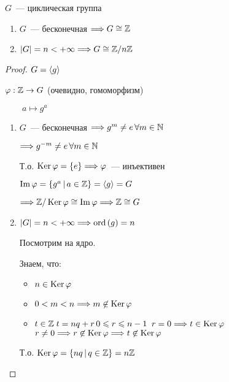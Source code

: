 \begin{theorem}
    $G$~--- циклическая группа 

    \begin{enumerate}
        \item $G$~--- бесконечная $\Longrightarrow G \cong \mathbb{Z}$
        \item $|G| = n < +\infty \Longrightarrow G \cong \mathbb{Z} / n \mathbb{Z}$
    \end{enumerate}

    \begin{proof}
        
        $G = \langle g \rangle$

        $\varphi: \mathbb{Z} \to G$ (очевидно, гомоморфизм)

        $\quad \quad a \mapsto g^a$

        \begin{enumerate}
            \item
            $G$~--- бесконечная $\Longrightarrow g^m \neq e \, \forall m \in \mathbb{N}$
            
            $\Longrightarrow g^{-m} \neq e \, \forall m \in \mathbb{N}$

            Т.о. $\operatorname{Ker} \varphi = \{ e \} \Longrightarrow \varphi$~--- инъективен

            $\operatorname{Im} \varphi = \{ g^a \, | \, a \in \mathbb{Z} \} = \langle g \rangle = G$

            $\Longrightarrow \mathbb{Z} / \operatorname{Ker} \varphi \cong \operatorname{Im} \varphi \Longrightarrow \mathbb{Z} \cong G$

            \item
            $|G| = n < +\infty \Longrightarrow \operatorname{ord}\left( g \right) = n$
            
            Посмотрим на ядро.

            Знаем, что:
            \begin{itemize}
                \item $n \in \operatorname{Ker} \varphi$
                \item $0 < m < n \Longrightarrow m \not \in \operatorname{Ker} \varphi$
                \item $t \in \mathbb{Z} \; t = nq + r \, 0 \leqslant r \leqslant n - 1$
                $r = 0 \Longrightarrow t \in \operatorname{Ker} \varphi$
                $r \neq 0 \Longrightarrow r \not \in \operatorname{Ker} \varphi \Longrightarrow t \not \in \operatorname{Ker} \varphi$
            \end{itemize}

            Т.о. $\operatorname{Ker} \varphi = \{ nq \, | \, q \in \mathbb{Z} \} = n \mathbb{Z}$


\end{enumerate}
\end{proof}
\end{theorem}
